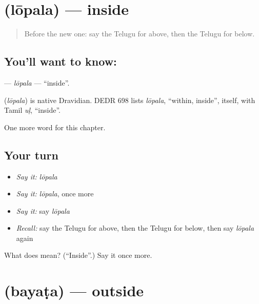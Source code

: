 \section[\texorpdfstring{\te{లోపల} (lōpala)}{లోపల (lōpala)}]{ (lōpala) — inside}

\label{lesson:TE-C101-lopala}



\begin{quote}
Before the new one: say the Telugu for above, then the Telugu for below.
\end{quote}

\subsection*{You'll want to know: }
\textbf{} — \emph{lōpala} — \textquotedblleft{}inside\textquotedblright{}.

\begin{cousinweb}
\textbf{} (\emph{lōpala}) is native Dravidian. DEDR 698 lists \emph{lōpala}, \textquotedblleft{}within, inside\textquotedblright{}, itself, with Tamil \emph{uḷ}, \textquotedblleft{}inside\textquotedblright{}.
\end{cousinweb}

\begin{grammarlens}[title={What you've built}]
One more word for this chapter.
\end{grammarlens}

\subsection*{Your turn}
\begin{itemize}
\raggedright
  \item \emph{Say it:} \emph{lōpala}
  \item \emph{Say it:} \emph{lōpala}, once more
  \item \emph{Say it:} say \emph{lōpala}
  \item \emph{Recall:} say the Telugu for above, then the Telugu for below, then say \emph{lōpala} again
\end{itemize}

\begin{tcolorbox}[breakable,colback=teal!4,colframe=teal!35!black,title={Before you move on}]
What does  mean? (\textquotedblleft{}Inside\textquotedblright{}.) Say it once more.
\end{tcolorbox}
\section[\texorpdfstring{\te{బయట} (bayaṭa)}{బయట (bayaṭa)}]{ (bayaṭa) — outside}


